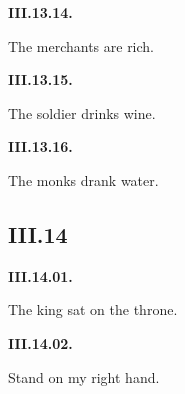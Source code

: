 \par\begin{minipage}{\linewidth}\raggedright
\textbf{III.13.14.}

The merchants are rich.

\end{minipage}\par\addvspace{4pt}

\par\begin{minipage}{\linewidth}\raggedright
\textbf{III.13.15.}

The soldier drinks wine.

\end{minipage}\par\addvspace{4pt}

\par\begin{minipage}{\linewidth}\raggedright
\textbf{III.13.16.}

The monks drank water.

\end{minipage}\par\addvspace{4pt}

\subsection*{III.14}

\par\begin{minipage}{\linewidth}\raggedright
\textbf{III.14.01.}

The king sat on the throne.

\end{minipage}\par\addvspace{4pt}

\par\begin{minipage}{\linewidth}\raggedright
\textbf{III.14.02.}

Stand on my right hand.

\end{minipage}\par\addvspace{4pt}

